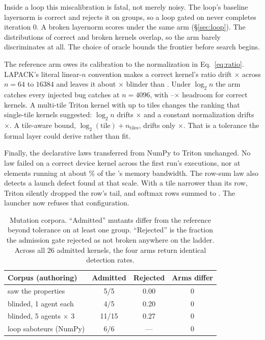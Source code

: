 Inside a loop this miscalibration is fatal, not merely noisy. The loop's baseline
layernorm is correct and \allclose rejects it on \fpAllcloseLN{} groups, so a loop gated
on \allclose never completes iteration 0. A broken layernorm scores \lnBrokenAllclose{}
under the same arm (\S\ref{sec:loop}). The distributions of correct and broken kernels
overlap, so the arm barely discriminates at all. The choice of oracle bounds the frontier
before search begins.

The reference arm owes its calibration to the normalization in Eq.~\eqref{eq:ratio}.
LAPACK's literal linear-$n$ convention makes a correct kernel's ratio drift
\linearNDrift$\times$ across $n = 64$ to $16384$ and leaves it about
\linearNBlinder$\times$ blinder than \allclose. Under $\log_2 n$ the arm catches every
injected bug \allclose catches at $n=4096$, with \logHeadroomLo--\logHeadroomHi$\times$
headroom for correct kernels. A multi-tile Triton kernel with up to
\multiTileMaxTiles{} tiles changes the ranking that single-tile kernels suggested:
$\log_2 n$ drifts \multiTileLogDrift$\times$ and a constant normalization drifts
\multiTileOneDrift$\times$. A tile-aware bound, $\log_2(\text{tile}) + n_\text{tiles}$,
drifts only \multiTileTileAwareDrift$\times$. That is a tolerance the formal layer
could derive rather than fit.

Finally, the declarative laws transferred from NumPy to Triton unchanged. No law failed on
a correct device kernel across the first run's \firstRunRows{} executions, nor at
\scaleElements{} elements running at about \scaleRoofline\% of the \gpuName's memory
bandwidth. The row-sum law also detects a launch defect found at that scale. With a
tile narrower than its row, Triton silently dropped the row's tail, and softmax rows
summed to \tileTailRowSum. The launcher now refuses that configuration.

\begin{table}[t]
\centering
\small
\setlength{\tabcolsep}{4pt}
\begin{tabular}{@{}lccc@{}}
\toprule
Corpus (authoring) & Admitted & Rejected & Arms differ \\
\midrule
saw the properties          & 5/5   & 0.00 & 0 \\
blinded, 1 agent each       & 4/5   & 0.20 & 0 \\
blinded, 5 agents $\times$ 3 & 11/15 & 0.27 & 0 \\
loop saboteurs (NumPy)      & 6/6   & ---  & 0 \\
\bottomrule
\end{tabular}
\caption{Mutation corpora. ``Admitted'' mutants differ from the reference beyond
  tolerance on at least one group. ``Rejected'' is the fraction the admission gate rejected
  as not broken anywhere on the ladder. Across all 26 admitted kernels, the four arms
  return identical detection rates.}
\label{tab:corpora}
\end{table}

